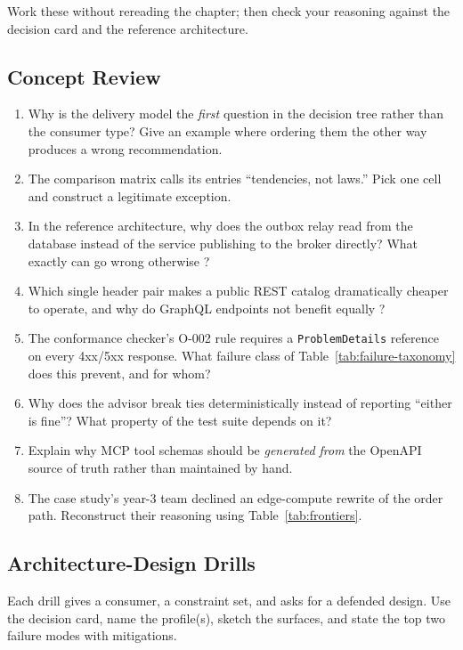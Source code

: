 Work these without rereading the chapter; then check your reasoning against
the decision card and the reference architecture.

\subsection{Concept Review}

\begin{enumerate}
  \item Why is the delivery model the \emph{first} question in the decision
        tree rather than the consumer type? Give an example where ordering
        them the other way produces a wrong recommendation.
  \item The comparison matrix calls its entries ``tendencies, not laws.''
        Pick one cell and construct a legitimate exception.
  \item In the reference architecture, why does the outbox relay read from
        the database instead of the service publishing to the broker
        directly? What exactly can go wrong otherwise
        \cite{kleppmann2017ddia}?
  \item Which single header pair makes a public REST catalog dramatically
        cheaper to operate, and why do GraphQL endpoints not benefit equally
        \cite{rfc9110}?
  \item The conformance checker's O-002 rule requires a
        \texttt{ProblemDetails} reference on every 4xx/5xx response. What
        failure class of Table~\ref{tab:failure-taxonomy} does this prevent,
        and for whom?
  \item Why does the advisor break ties deterministically instead of
        reporting ``either is fine''? What property of the test suite
        depends on it?
  \item Explain why MCP tool schemas should be \emph{generated from} the
        OpenAPI source of truth rather than maintained by hand.
  \item The case study's year-3 team declined an edge-compute rewrite of the
        order path. Reconstruct their reasoning using
        Table~\ref{tab:frontiers}.
\end{enumerate}

\subsection{Architecture-Design Drills}

Each drill gives a consumer, a constraint set, and asks for a defended
design. Use the decision card, name the profile(s), sketch the surfaces, and
state the top two failure modes with mitigations.

